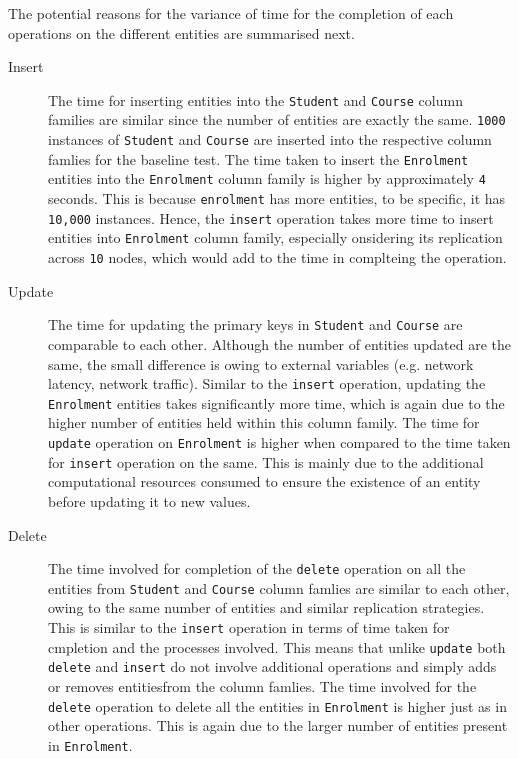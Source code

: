	The potential reasons for the variance of time for the completion of each
	operations on the different entities are summarised next.
	\begin{description}
	\item[Insert] The time for inserting entities into the \texttt{Student} and
	\texttt{Course} column families are similar since the number of entities are
	exactly the same.
	\texttt{1000} instances of \texttt{Student} and \texttt{Course} are inserted
	into the respective column famlies for the baseline test. The time taken to
	insert the \texttt{Enrolment} entities into the \texttt{Enrolment} column family
	is higher by approximately \texttt{4} seconds. This is because
	\texttt{enrolment} has more entities, to be specific, it has \texttt{10,000}
	instances. Hence, the \texttt{insert} operation takes more time to insert
	entities into \texttt{Enrolment} column family, especially onsidering its
	replication across \texttt{10} nodes, which would add to the time in
	complteing the operation.
	
	\item[Update] The time for updating the primary keys in \texttt{Student} and
	\texttt{Course} are comparable to each other. Although the number of entities
	updated are the same, the small difference is owing to external variables
	(e.g. network latency, network traffic). Similar to the \texttt{insert}
	operation, updating the \texttt{Enrolment} entities takes significantly more
	time, which is again due to the higher number of entities held within this
	column family. The time for \texttt{update} operation on \texttt{Enrolment} is
	higher when compared to the time taken for \texttt{insert} operation on the
	same. This is mainly due to the additional computational resources consumed to
	ensure the existence of an entity before updating it to new values.
	
	\item[Delete] The time involved for completion of the \texttt{delete} operation
	on all the entities from \texttt{Student} and \texttt{Course} column famlies are
	similar to each other, owing to the same number of entities and similar
	replication strategies. This is similar to the \texttt{insert} operation in
	terms of time taken for cmpletion and the processes involved. This means that
	unlike \texttt{update} both \texttt{delete} and \texttt{insert} do not
	involve additional operations and simply adds or removes entitiesfrom the
	column famlies.
	The time involved for the \texttt{delete} operation to delete all the entities
	in \texttt{Enrolment} is higher just as in other operations. This is again due
	to the larger number of entities present in \texttt{Enrolment}.
	\end{description}


